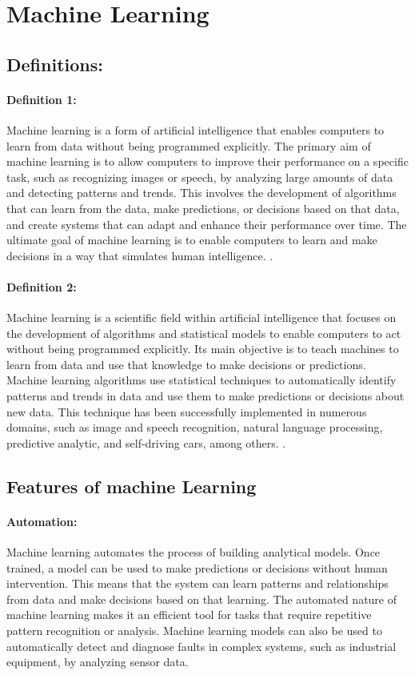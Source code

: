 \section{Machine Learning}
	\subsection{Definitions:}
		\paragraph{Definition 1:}
		Machine learning is a form of artificial intelligence that enables computers to learn from data without being programmed explicitly. The primary aim of machine learning is to allow computers to improve their performance on a specific task, such as recognizing images or speech, by analyzing large amounts of data and detecting patterns and trends. This involves the development of algorithms that can learn from the data, make predictions, or decisions based on that data, and create systems that can adapt and enhance their performance over time. The ultimate goal of machine learning is to enable computers to learn and make decisions in a way that simulates human intelligence. \cite{alpaydin2010introduction}.
		\paragraph{Definition 2:}
		Machine learning is a scientific field within artificial intelligence that focuses on the development of algorithms and statistical models to enable computers to act without being programmed explicitly. Its main objective is to teach machines to learn from data and use that knowledge to make decisions or predictions. Machine learning algorithms use statistical techniques to automatically identify patterns and trends in data and use them to make predictions or decisions about new data. This technique has been successfully implemented in numerous domains, such as image and speech recognition, natural language processing, predictive analytic, and self-driving cars, among others. \cite{murphy2012machine}.
		
	\subsection{Features of machine Learning}	
		\paragraph{Automation:}
		Machine learning automates the process of building analytical models. Once trained, a model can be used to make predictions or decisions without human intervention. This means that the system can learn patterns and relationships from data and make decisions based on that learning. The automated nature of machine learning makes it an efficient tool for tasks that require repetitive pattern recognition or analysis. Machine learning models can also be used to automatically detect and diagnose faults in complex systems, such as industrial equipment, by analyzing sensor data. \cite{alpaydin2010introduction}
	

